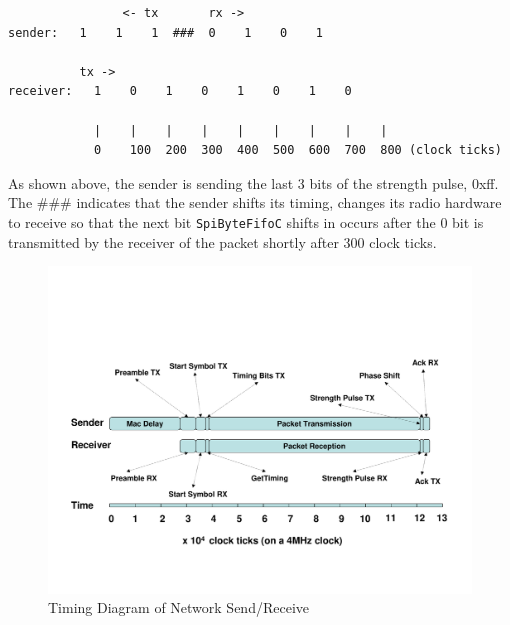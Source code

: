 \documentclass[11pt]{article}
\begin{document}
\small
\begin{verbatim}
                <- tx       rx ->
sender:   1    1    1  ###  0    1    0    1

          tx ->
receiver:   1    0    1    0    1    0    1    0

            |    |    |    |    |    |    |    |    |
            0    100  200  300  400  500  600  700  800 (clock ticks)
\end{verbatim}
\normalsize

As shown above, the sender is sending the last 3 bits of the strength
pulse, 0xff. The \#\#\# indicates that the sender shifts its timing,
changes its radio hardware to receive so that the next bit {\tt SpiByteFifoC}
shifts in occurs after the 0 bit is transmitted by the receiver of the
packet shortly after 300 clock ticks.

%

\begin{figure}
\centering
\includegraphics[scale=0.6,angle=-90]{fig/stack.pdf}
\caption{Timing Diagram of Network Send/Receive}
\label{fig:timing}
\end{figure}
\end{document}
